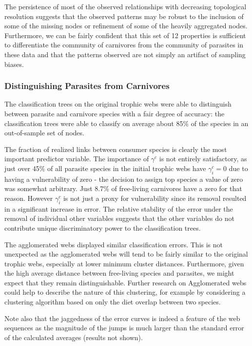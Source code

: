 \documentclass[/home/nkappler/Research/Dissertation/dissertation.tex]{subfiles}
\begin{document}
\begin{bibunit}
The persistence of most of the observed relationships with decreasing
topological resolution suggests that the observed patterns may be robust to the
inclusion of some of the missing nodes or refinement of some of the heavily
aggregated nodes. Furthermore, we can be fairly confident that this set of 12
properties is sufficient to differentiate the community of carnivores from the
community of parasites in these data and that the patterns observed are not
simply an artifact of sampling biases.

\subsubsection{Distinguishing Parasites from Carnivores} The classification
trees on the original trophic webs were able to distinguish between parasite
and carnivore species with a fair degree of accuracy: the classification trees
were able to classify on average about 85\% of the species in an out-of-sample
set of nodes. 

The fraction of realized links between consumer species is clearly the most
important predictor variable. The importance of $\gamma^{c}$ is not entirely
satisfactory, as just over 45\% of all parasite species in the initial trophic
webs have $\gamma^{c}_i=0$ due to having a vulnerability of zero - the
decision to assign top species a value of zero was somewhat arbitrary. Just
8.7\% of free-living carnivores have a zero for that reason. However
$\gamma^{c}_i$ is not just a proxy for vulnerability since its removal
resulted in a significant increase in error. The relative stability of the
error under the removal of individual other variables suggests that the other
variables do not contribute unique discriminatory power to the classification
trees.

The agglomerated webs displayed similar classification errors. This is not
unexpected as the agglomerated webs will tend to be fairly similar to the
original trophic webs, especially at lower minimum cluster distances.
Furthermore, given the high average distance between free-living species and
parasites, we might expect that they remain distinguishable. Further research
on Agglomerated webs could help to describe the nature of this clustering, for
example by considering a clustering algorithm based on only the diet overlap
between two species.

Note also that the jaggedness of the error curves is indeed a feature of the
web sequences as the magnitude of the jumps is much larger than the standard
error of the calculated averages (results not shown). 


\end{bibunit}
\end{document}
